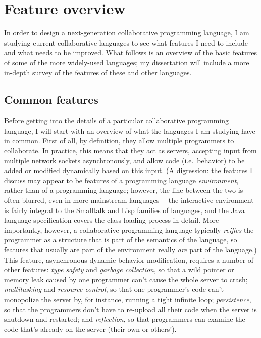 \documentclass{article}
\begin{document}
\section{Feature overview}

In order to design a next-generation collaborative programming
language, I am studying current collaborative languages to see what
features I need to include and what needs to be improved.  What follows
is an overview of the basic features of some of the more widely-used
languages; my dissertation will include a more in-depth survey of the
features of these and other languages.
\subsection{Common features}
\label{features}
Before getting into the details of a particular collaborative
programming language, I will start with an overview of what the
languages I am studying have in common.  First of all, by definition,
they allow multiple programmers to collaborate.  In practice, this
means that they act as servers, accepting input from multiple network
sockets asynchronously, and allow code (i.e.~behavior) to be added or
modified dynamically based on this input.  (A digression: the features
I discuss may appear to be features of a programming language
\emph{environment}, rather than of a programming language; however, the
line between the two is often blurred, even in more mainstream
languages--- the interactive environment is fairly integral to the
Smalltalk\cite{Smalltalk} and Lisp\cite{Lisp} families of languages,
and the Java language specification\cite{JLS} covers the class loading
process in detail.  More importantly, however, a collaborative
programming language typically
\emph{reifies} the programmer as a structure that is
part of the semantics of the language, so features that usually are
part of the environment really \emph{are} part of the language.)  This
feature, asynchronous dynamic behavior modification, requires a number
of other features: \emph{type safety} and \emph{garbage collection},
so that a wild pointer or memory leak caused by one programmer can't
cause the whole server to crash; \emph{multitasking} and
\emph{resource control}, so that one programmer's code can't
monopolize the server by, for instance, running a tight infinite loop;
\emph{persistence}, so that the programmers don't have to re-upload all their
code when the server is shutdown and restarted; and \emph{reflection},
so that programmers can examine the code that's already on the server
(their own or others').
\end{document}
